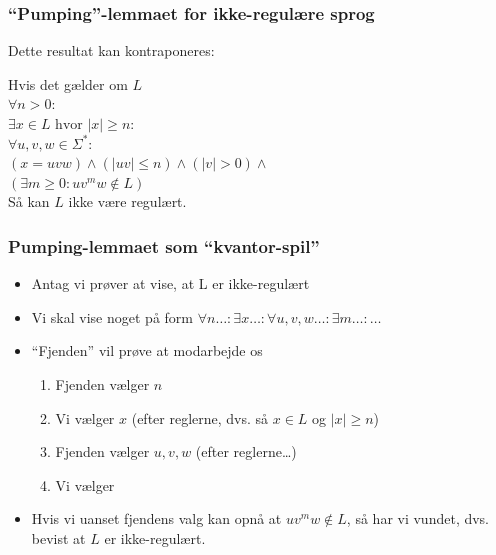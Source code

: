 \documentclass{beamer}
\begin{document}
\begin{frame}
\frametitle{``Pumping''-lemmaet for \alert{ikke}-regulære sprog}
Dette resultat kan kontraponeres:
\pause
{}%
\begin{beamerboxesrounded}[lower=lowercol,shadow=true]{}
  Hvis det gælder om $L$\\
\pause
\hspace{1cm}$\forall n>0:$\\
\pause
\hspace{2cm}$\exists x\in L \text{ hvor } |x| \geq n:$\\
\pause
\hspace{3cm}$\forall u,v,w\in \Sigma^*:$\\
\pause
\hspace{4cm}$(x = uvw) \wedge (|uv|\leq n) \wedge (|v| > 0) \wedge$\\
\pause
\hspace{4cm}$(\exists m\geq 0: uv^mw\not\in L)$\\
\pause
Så kan $L$ ikke være regulært.
\end{beamerboxesrounded}
\end{frame}

\begin{frame}
\frametitle{Pumping-lemmaet som ``kvantor-spil''}
\begin{itemize}[<+->]
\item  Antag vi prøver at vise, at L er ikke-regulært 
\item  Vi skal vise noget på form 
 $\forall n\ldots:   \exists x\ldots:  \forall u,v,w \ldots:  \exists m\ldots:  \ldots$ 
\item  ``Fjenden'' vil prøve at modarbejde os
  \begin{enumerate}
  \item Fjenden vælger {\color{dr}$n$}
  \item Vi vælger {\color{dg}$x$}   (efter reglerne, dvs. så $x\in L$ og $|x|\geq n$) 
  \item Fjenden vælger {\color{dr}$u,v,w$}   (efter reglerne\ldots) 
  \item Vi vælger \color{dg}{$m$}
  \end{enumerate}
\item
Hvis vi uanset fjendens valg kan opnå at $uv^mw\not\in L$, 
så har vi vundet, dvs. bevist at $L$ er ikke-regulært.
\end{itemize}
\end{frame}
\end{document}
